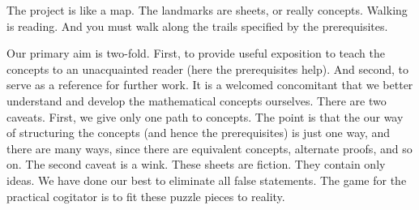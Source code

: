 
The project is like a map.
The landmarks are sheets, or really concepts.
Walking is reading.
And you must walk along the trails specified by the prerequisites.


Our primary aim is two-fold.
First, to provide useful exposition to teach the concepts to an unacquainted reader (here the prerequisites help).
And second, to serve as a reference for further work.
It is a welcomed concomitant that we better understand and develop the mathematical concepts ourselves.
%
There are two caveats.
First, we give only one path to concepts.
The point is that the our way of structuring the concepts (and hence the prerequisites) is just one way, and there are many ways, since there are equivalent concepts, alternate proofs, and so on.
The second caveat is a wink.
These sheets are fiction.
They contain only ideas.
We have done our best to eliminate all false statements.
The game for the practical cogitator is to fit these puzzle pieces to reality.


